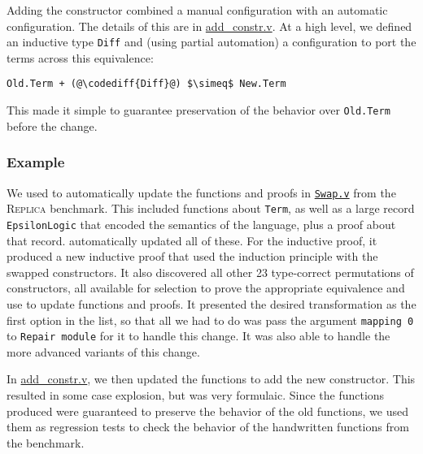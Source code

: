 Adding the constructor combined a manual configuration with an automatic configuration.
The details of this are in \href{https://github.com/uwplse/pumpkin-pi/blob/master/plugin/coq/playground/add_constr.v}{add_constr.v}.
At a high level, we defined an inductive type \lstinline{Diff} and (using partial automation) a configuration to port the terms across this equivalence:

\begin{lstlisting}
Old.Term + (@\codediff{Diff}@) $\simeq$ New.Term
\end{lstlisting}
This made it simple to guarantee preservation of the behavior over \lstinline{Old.Term} before the change.

\subsubsection{Example}

We used \toolname to automatically update the functions and proofs in \href{https://github.com/uwplse/pumpkin-pi/blob/master/plugin/coq/Swap.v}{\lstinline{Swap.v}} from the \textsc{Replica} benchmark.
This included functions about \lstinline{Term}, as well as a large record \lstinline{EpsilonLogic} that encoded the semantics of the language,
plus a proof about that record.
\toolname automatically updated all of these. For the inductive proof, it produced
a new inductive proof that used the induction principle with the swapped constructors.
It also discovered all other 23 type-correct permutations of constructors, all available for selection to 
prove the appropriate equivalence and use to update functions and proofs.
It presented the desired transformation as the first option in the list, so that all we had to do
was pass the argument \lstinline{mapping 0} to \lstinline{Repair module} for it to handle this change.
It was also able to handle the more advanced variants of this change.

In \href{https://github.com/uwplse/pumpkin-pi/blob/master/plugin/coq/playground/add_constr.v}{add_constr.v},
we then updated the functions to add the new constructor.
This resulted in some case explosion, but was very formulaic.
Since the functions \toolname produced were guaranteed to preserve the behavior of the old functions,
we used them as regression tests to check the behavior of the handwritten functions from the benchmark.

